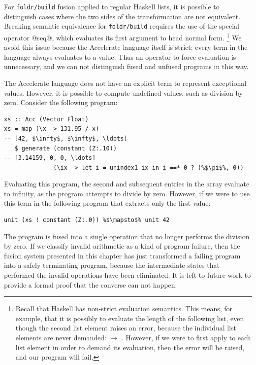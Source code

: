 For \texttt{foldr/build} fusion applied to regular Haskell lists, it is possible
to distinguish cases where the two sides of the transformation are not
equivalent. Breaking semantic equivalence for \texttt{foldr/build} requires the
use of the special operator @seq@, which evaluates its first argument to head
normal form.%
\footnote{Recall that Haskell has non-strict evaluation semantics. This means,
for example, that it is possibly to evaluate the length of the following list,
even though the second list element raises an error, because the individual list
elements are never demanded:  $\mapsto$
. However, if we were to first apply  to each list
element in order to demand its evaluation, then the error will be raised, and
our program will fail.}
We avoid this issue because the Accelerate language itself is strict: every term
in the language always evaluates to a value. Thus an operator to force
evaluation is unnecessary, and we can not distinguish fused and unfused programs
in this way.

The Accelerate language does not have an explicit term to represent exceptional
values. However, it is possible to compute undefined values, such as division by
zero. Consider the following program:
%
\begin{lstlisting}[style=haskell]
xs :: Acc (Vector Float)
xs = map (\x -> 131.95 / x)                                             -- [42, $\infty$, $\infty$, \ldots]
   $ generate (constant (Z:.10))                                        -- [3.14159, 0, 0, \ldots]
              (\ix -> let i = unindex1 ix in i ==* 0 ? (%$\pi$%, 0))
\end{lstlisting}
%
Evaluating this program, the second and subsequent entries in the array evaluate
to infinity, as the program attempts to divide by zero. However, if we were to
use this term in the following program that extracts only the first value:
%
\begin{lstlisting}[style=haskell]
unit (xs ! constant (Z:.0)) %$\mapsto$% unit 42
\end{lstlisting}
%
The program is fused into a single operation that no longer performs the
division by zero. If we classify invalid arithmetic as a kind of program
failure, then the fusion system presented in this chapter has just transformed a
failing program into a safely terminating program, because the intermediate
states that performed the invalid operations have been eliminated. It is left to
future work to provide a formal proof that the converse can not happen.


